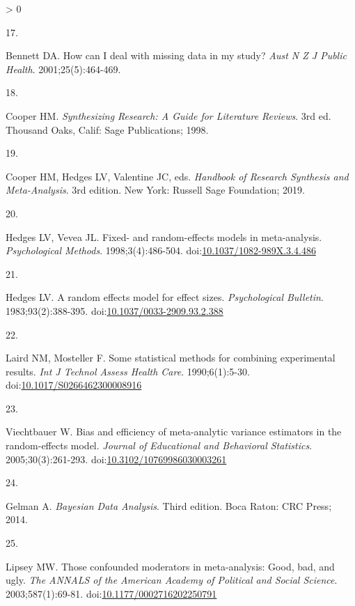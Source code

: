 \documentclass[
]{article}
\newlength{\cslhangindent}
\newlength{\csllabelwidth}
\newenvironment{CSLReferences}[2] %
 {%
  \setlength{\parindent}{0pt}
  \ifodd #1 \everypar{\setlength{\hangindent}{\cslhangindent}}\ignorespaces\fi
  \ifnum #2 > 0
  \setlength{\parskip}{#2\baselineskip}
  \fi
 }%
 {}
\newcommand{\CSLLeftMargin}[1]{\parbox[t]{\csllabelwidth}{#1}}
\newcommand{\CSLRightInline}[1]{\parbox[t]{\linewidth - \csllabelwidth}{#1}\break}
\begin{document}
\begin{CSLReferences}{0}{0}
\leavevmode\hypertarget{ref-bennettHowCanDeal2001}{}%
\CSLLeftMargin{17. }
\CSLRightInline{Bennett DA. How can I deal with missing data in my study? \emph{Aust N Z J Public Health}. 2001;25(5):464-469.}

\leavevmode\hypertarget{ref-cooperSynthesizingResearchGuide1998}{}%
\CSLLeftMargin{18. }
\CSLRightInline{Cooper HM. \emph{Synthesizing Research: A Guide for Literature Reviews}. 3rd ed. Thousand Oaks, Calif: Sage Publications; 1998.}

\leavevmode\hypertarget{ref-cooperHandbookResearchSynthesis2019}{}%
\CSLLeftMargin{19. }
\CSLRightInline{Cooper HM, Hedges LV, Valentine JC, eds. \emph{Handbook of Research Synthesis and Meta-Analysis}. 3rd edition. New York: Russell Sage Foundation; 2019.}

\leavevmode\hypertarget{ref-hedgesFixedRandomeffectsModels1998}{}%
\CSLLeftMargin{20. }
\CSLRightInline{Hedges LV, Vevea JL. Fixed- and random-effects models in meta-analysis. \emph{Psychological Methods}. 1998;3(4):486-504. doi:\href{https://doi.org/10.1037/1082-989X.3.4.486}{10.1037/1082-989X.3.4.486}}

\leavevmode\hypertarget{ref-hedgesRandomEffectsModel1983}{}%
\CSLLeftMargin{21. }
\CSLRightInline{Hedges LV. A random effects model for effect sizes. \emph{Psychological Bulletin}. 1983;93(2):388-395. doi:\href{https://doi.org/10.1037/0033-2909.93.2.388}{10.1037/0033-2909.93.2.388}}

\leavevmode\hypertarget{ref-lairdStatisticalMethodsCombining1990}{}%
\CSLLeftMargin{22. }
\CSLRightInline{Laird NM, Mosteller F. Some statistical methods for combining experimental results. \emph{Int J Technol Assess Health Care}. 1990;6(1):5-30. doi:\href{https://doi.org/10.1017/S0266462300008916}{10.1017/S0266462300008916}}

\leavevmode\hypertarget{ref-viechtbauerBiasEfficiencyMetaanalytic2005}{}%
\CSLLeftMargin{23. }
\CSLRightInline{Viechtbauer W. Bias and efficiency of meta-analytic variance estimators in the random-effects model. \emph{Journal of Educational and Behavioral Statistics}. 2005;30(3):261-293. doi:\href{https://doi.org/10.3102/10769986030003261}{10.3102/10769986030003261}}

\leavevmode\hypertarget{ref-gelmanBayesianDataAnalysis2014}{}%
\CSLLeftMargin{24. }
\CSLRightInline{Gelman A. \emph{Bayesian Data Analysis}. Third edition. Boca Raton: CRC Press; 2014.}

\leavevmode\hypertarget{ref-lipseyThoseConfoundedModerators2003}{}%
\CSLLeftMargin{25. }
\CSLRightInline{Lipsey MW. Those confounded moderators in meta-analysis: Good, bad, and ugly. \emph{The ANNALS of the American Academy of Political and Social Science}. 2003;587(1):69-81. doi:\href{https://doi.org/10.1177/0002716202250791}{10.1177/0002716202250791}}


\end{CSLReferences}
\end{document}
